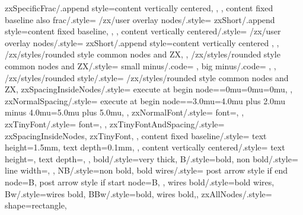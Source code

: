 {{{{        %
        zxSpecificFrac/.append style={content vertically centered},
      },
    },
    content fixed baseline also frac/.style={
      /zx/user overlay nodes/.style={
        zxShort/.append style={content fixed baseline},
      },
    },
    content vertically centered/.style={
      /zx/user overlay nodes/.style={
        zxShort/.append style={content vertically centered}
      },
    },
    /zx/styles/rounded style common nodes and ZX,
  },
  /zx/styles/rounded style common nodes and ZX/.style={
    small minus/.code={
      \def\zxMinus{\zxShortMinus}%
      \def\zxMinusInShort{\zxShortMinus}%
    },
    big minus/.code={
      \def\zxMinus{-}%
      \def\zxMinusInShort{-}%
    },
  },
  /zx/styles/rounded style/.style={
    /zx/styles/rounded style common nodes and ZX,
    zxSpacingInsideNodes/.style={
      execute at begin node={\thinmuskip=0mu\medmuskip=0mu\thickmuskip=0mu}, %
    },
    zxNormalSpacing/.style={
      execute at begin node={\thinmuskip=3.0mu\medmuskip=4.0mu plus 2.0mu minus 4.0mu\thickmuskip=5.0mu plus 5.0mu}, %
    },
    zxNormalFont/.style={
      font={\fontsize{10}{12}\selectfont},
    },
    zxTinyFont/.style={
      font={\fontsize{6}{6}\selectfont},
    },
    zxTinyFontAndSpacing/.style={
      zxSpacingInsideNodes,
      zxTinyFont,
    },
    content fixed baseline/.style={
      text height=1.5mm,%
      text depth=0.1mm,%
    },
    content vertically centered/.style={
      text height=,
      text depth=,
    },
    bold/.style={very thick},
    B/.style={bold},
    non bold/.style={%
      line width=\zxDefaultLineWidth,
    },
    NB/.style={non bold},
    bold wires/.style={
      post arrow style if end node={B},
      post arrow style if start node={B},
    },
    wires bold/.style={bold wires},%
    Bw/.style={wires bold},
    BBw/.style={bold, wires bold,},
    zxAllNodes/.style={
      shape=rectangle, %
}}}
